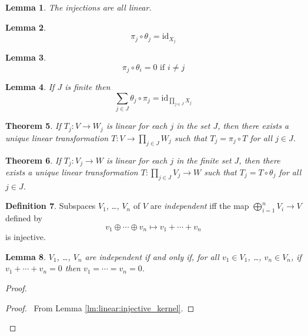 \documentclass{book}
\let\qed\relax
\newtheorem{lm}{Lemma}[chapter]
\newtheorem{thm}[lm]{Theorem}
\theoremstyle{definition}
\newtheorem{df}[lm]{Definition}
\newcommand{\id}[1]{\ensuremath{\mathrm{id}_{#1}}}
\begin{document}
  \begin{lm}
    The injections are all linear.
  \end{lm}
  
  \begin{lm}
    \[ \pi_j \circ \theta_j = \id{X_j} \]
  \end{lm}
  
  \begin{lm}
    \[ \pi_j \circ \theta_i = 0 \text{ if } i \neq j \]
  \end{lm}
  
  \begin{lm}
    If $J$ is finite then \[ \sum_{j \in J} \theta_j \circ \pi_j = \id{\prod_{j 
        \in J} X_j} \]
  \end{lm}
  
  \begin{thm}
    If $T_j : V \rightarrow W_j$ is linear for each $j$ in the set $J$, 
    then there exists a unique linear transformation $T : V \rightarrow 
    \prod_{j 
      \in J} W_j$ such that $T_j = \pi_j \circ T$ for all $j \in J$.
  \end{thm}
  
  \begin{thm}
    If $T_j : V_j \rightarrow W$ is linear for each $j$ in the finite set $J$, 
    then there exists a unique linear transformation $T : \prod_{j \in J} V_j 
    \rightarrow W$ such that $T_j = T \circ \theta_j$ for all $j \in J$.
  \end{thm}
  
  \begin{df}
    Subspaces $V_1$, \ldots, $V_n$ of $V$ are \emph{independent} iff the 
    map $\bigoplus_{i=1}^n V_i \rightarrow V$ defined by
    \[ v_1 \oplus \cdots \oplus v_n \mapsto v_1 + \cdots + v_n \]
    is injective.
  \end{df}
  
  \begin{lm}
    $V_1$, \ldots, $V_n$ are independent if and only if, for all $v_1 \in V_1$, 
    \ldots, $v_n \in V_n$, if $v_1 + \cdots + v_n = 0$ then $v_1 = \cdots = v_n 
    = 
    0$.
  \end{lm}
  
  \begin{proof}
    \pf
    \begin{proof}
      \pf\ From Lemma \ref{lm:linear:injective_kernel}.
    \end{proof}
    \qed
  \end{proof}
  
\end{document}
